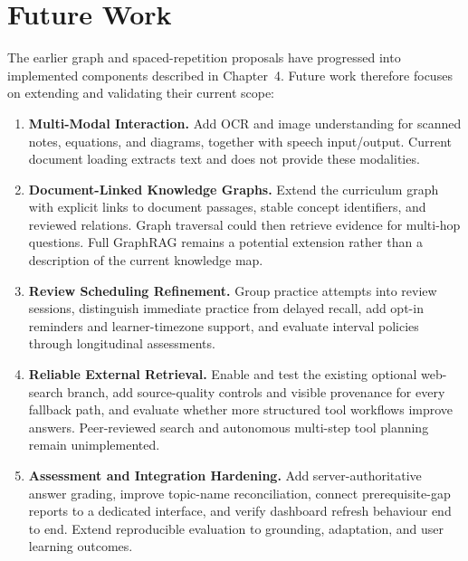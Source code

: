 \documentclass[11pt, a4paper, oneside]{report}
\begin{document}
\section{Future Work}
The earlier graph and spaced-repetition proposals have progressed into implemented components described in Chapter~4. Future work therefore focuses on extending and validating their current scope:
\begin{enumerate}[leftmargin=2.5em, itemsep=8pt]
  \item \textbf{Multi-Modal Interaction.} Add OCR and image understanding for scanned notes, equations, and diagrams, together with speech input/output. Current document loading extracts text and does not provide these modalities.
  \item \textbf{Document-Linked Knowledge Graphs.} Extend the curriculum graph with explicit links to document passages, stable concept identifiers, and reviewed relations. Graph traversal could then retrieve evidence for multi-hop questions. Full GraphRAG remains a potential extension rather than a description of the current knowledge map.
  \item \textbf{Review Scheduling Refinement.} Group practice attempts into review sessions, distinguish immediate practice from delayed recall, add opt-in reminders and learner-timezone support, and evaluate interval policies through longitudinal assessments.
  \item \textbf{Reliable External Retrieval.} Enable and test the existing optional web-search branch, add source-quality controls and visible provenance for every fallback path, and evaluate whether more structured tool workflows improve answers. Peer-reviewed search and autonomous multi-step tool planning remain unimplemented.
  \item \textbf{Assessment and Integration Hardening.} Add server-authoritative answer grading, improve topic-name reconciliation, connect prerequisite-gap reports to a dedicated interface, and verify dashboard refresh behaviour end to end. Extend reproducible evaluation to grounding, adaptation, and user learning outcomes.
\end{enumerate}

\appendix
\end{document}
